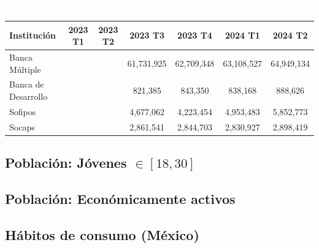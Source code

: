 \begin{table}[h!]
    \centering
    \caption{\textcolor{white}{Número total de créditos otorgados por tipo de institución (trimestral)}}
    \color{white}
    \begin{tabular}{lcccccc}
        \hline
        \textbf{Institución} & \textbf{2023 T1} & \textbf{2023 T2} & \textbf{2023 T3} & \textbf{2023 T4} & \textbf{2024 T1} & \textbf{2024 T2} \\
        \hline
        Banca Múltiple       &                 &                 &         61,731,925        &        62,709,348        &         63,108,527        &        64,949,134         \\
        Banca de Desarrollo  &                 &                 &        821,385         &        843,350         &         838,168        &           888,626         \\
        Sofipos              &                &                 &        4,677,062          &         4,223,454        &        4,953,483         &           5,852,773       \\
        Socaps               &                 &                 &        2,861,541         &         2,844,703       &        2,830,927         &           2,898,419       \\
        \hline
    \end{tabular}
    \label{tab:total_creditos_trimestrales}
\end{table}



\subsection*{Población: Jóvenes $\in[18,30]$}

\subsection*{Población: Económicamente activos}

\subsection*{Hábitos de consumo (México)}